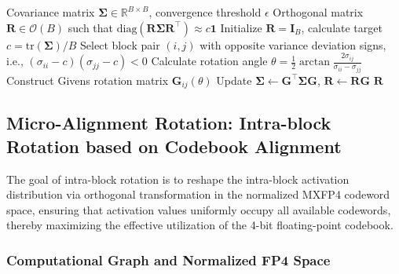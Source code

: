 \begin{algorithm}[tb]
   \caption{Givens Rotation for Variance Equalization}
   \label{alg:givens}
\begin{algorithmic}[1]
    Covariance matrix $\boldsymbol{\Sigma} \in \mathbb{R}^{B \times B}$, convergence threshold $\epsilon$
    Orthogonal matrix $\mathbf{R} \in \mathcal{O}(B)$ such that $\mathrm{diag}(\mathbf{R}\boldsymbol{\Sigma}\mathbf{R}^\top) \approx c\mathbf{1}$
   \STATE Initialize $\mathbf{R} = \mathbf{I}_B$, calculate target $c = \mathrm{tr}(\boldsymbol{\Sigma})/B$
       \STATE Select block pair $(i, j)$ with opposite variance deviation signs, i.e., $(\sigma_{ii} - c)(\sigma_{jj} - c) < 0$
       \STATE Calculate rotation angle $\theta = \frac{1}{2}\arctan \frac{2\sigma_{ij}}{\sigma_{ii} - \sigma_{jj}}$
       \STATE Construct Givens rotation matrix $\mathbf{G}_{ij}(\theta)$
       \STATE Update $\boldsymbol{\Sigma} \leftarrow \mathbf{G}^\top \boldsymbol{\Sigma} \mathbf{G}$, $\mathbf{R} \leftarrow \mathbf{R}\mathbf{G}$
   \ENDWHILE
    $\mathbf{R}$
\end{algorithmic}
\end{algorithm}

\subsection{Micro-Alignment Rotation: Intra-block Rotation based on Codebook Alignment}

The goal of intra-block rotation is to reshape the intra-block activation distribution via orthogonal transformation in the normalized MXFP4 codeword space, ensuring that activation values uniformly occupy all available codewords, thereby maximizing the effective utilization of the 4-bit floating-point codebook.

\subsubsection{Computational Graph and Normalized FP4 Space}

